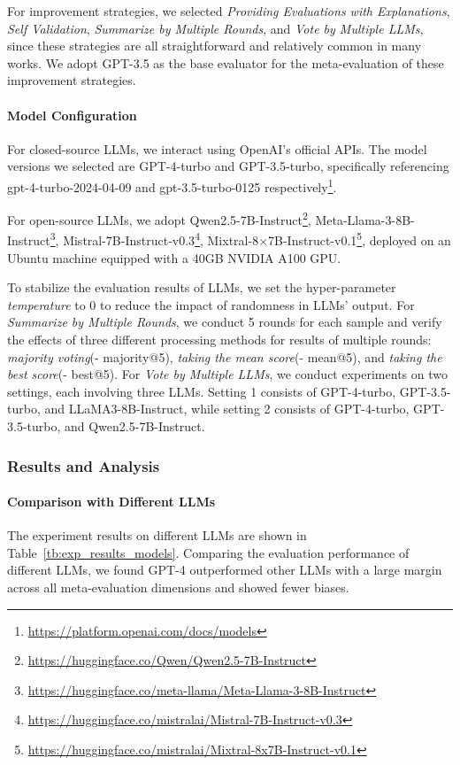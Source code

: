 \documentclass[acmsmall,screen]{acmart}
\begin{document}
For improvement strategies, we selected \textit{Providing Evaluations with Explanations}, \textit{Self Validation}, \textit{Summarize by Multiple Rounds}, and \textit{Vote by Multiple LLMs}, since these strategies are all straightforward and relatively common in many works. We adopt GPT-3.5 as the base evaluator for the meta-evaluation of these improvement strategies.

\paragraph{\textbf{Model Configuration}}
For closed-source LLMs, we interact using OpenAI's official APIs. The model versions we selected are GPT-4-turbo and GPT-3.5-turbo, specifically referencing gpt-4-turbo-2024-04-09 and gpt-3.5-turbo-0125 respectively\footnote{\url{https://platform.openai.com/docs/models}}.

For open-source LLMs, we adopt Qwen2.5-7B-Instruct\footnote{\url{https://huggingface.co/Qwen/Qwen2.5-7B-Instruct}}, Meta-Llama-3-8B-Instruct\footnote{\url{https://huggingface.co/meta-llama/Meta-Llama-3-8B-Instruct}}, Mistral-7B-Instruct-v0.3\footnote{\url{https://huggingface.co/mistralai/Mistral-7B-Instruct-v0.3}}, Mixtral-8$\times$7B-Instruct-v0.1\footnote{\url{https://huggingface.co/mistralai/Mixtral-8x7B-Instruct-v0.1}}, deployed on an Ubuntu machine equipped with a 40GB NVIDIA A100 GPU. 

To stabilize the evaluation results of LLMs, we set the hyper-parameter \textit{temperature} to 0 to reduce the impact of randomness in LLMs' output. For \textit{Summarize by Multiple Rounds}, we conduct 5 rounds for each sample and verify the effects of three different processing methods for results of multiple rounds: \textit{majority voting}(- majority@5), \textit{taking the mean score}(- mean@5), and \textit{taking the best score}(- best@5). For \textit{Vote by Multiple LLMs}, we conduct experiments on two settings, each involving three LLMs. Setting 1 consists of GPT-4-turbo, GPT-3.5-turbo, and LLaMA3-8B-Instruct, while setting 2 consists of GPT-4-turbo, GPT-3.5-turbo, and Qwen2.5-7B-Instruct.



\subsubsection{\textbf{Results and Analysis}}
\label{subsec:exp_results}
\paragraph{\textbf{Comparison with Different LLMs}}
The experiment results on different LLMs are shown in Table~\ref{tb:exp_results_models}. 
Comparing the evaluation performance of different LLMs, we found GPT-4 outperformed other LLMs with a large margin across all meta-evaluation dimensions and showed fewer biases. 
\end{document}
